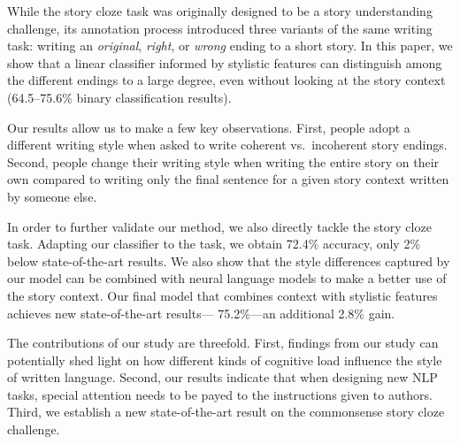 \documentclass[11pt,a4paper]{article}
\newcommand{\com}[1]{}
\newcommand{\resolved}[1]{}
\newcommand{\roy}[1]{{\color{orange}\textsc{[#1 --rs]}}}
\newcommand{\nascomment}[1]{{\color{blue}\textsc{[#1 --nas]}}}
\renewcommand{\roy}[1]{{\color{orange}[#1 --rs]}}
\renewcommand{\roy}[1]{#1}
\renewcommand{\nascomment}[1]{}
\begin{document}

While the story cloze task was originally designed to be a story understanding challenge, 
its annotation process introduced three variants of the same writing task: writing an {\it original}, {\it right}, or {\it wrong} ending to a short story.
In this paper, we show that a linear classifier informed by stylistic features can distinguish among the different endings to a large degree, even without looking at the story context (64.5--75.6\% binary classification results).

Our results allow us to make a few key observations.
First, people adopt a different writing style when asked to write coherent vs.~incoherent story endings.
Second,  people change their writing style when writing the entire story on their own compared to 
writing only the final sentence for a given story context written by someone else.


In order to further validate our method, we also directly tackle the
story cloze task\nascomment{cite the challenge?  a reader may
  not realize that there is a shared task on this}\resolved{\roy{Maybe ``challenge'' was not the right term here. We basically mean the story cloze task. The shared task was the original task w/o any modification, so I am not referring to it specifically here}}. 
 Adapting our classifier to the task, we obtain 72.4\% accuracy, \com{a
 12.5\% increase over the previously reported state-of-the-art  \cite{Salle:2016}}\roy{only 2\% below state-of-the-art results}.
We also show that the style differences captured by our model can be combined with neural language models to make a better use of the story context. 
Our final model that combines context with stylistic features achieves \roy{new state-of-the-art results---}
75.2\%---an additional 2.8\% gain\com{, 15.3\% better than the best
published result}.

\com{Our results suggest that writing style is affected by the the writer's state of mind.
Writing a sentence intended to be {\it wrong} turns out quite differently than a sentence intended to be {\it right}. 
Similarly, writing a sentence as part of the story is different from reading a story, and then writing the final sentence.}

The contributions of our study are threefold. 
First, findings from our study can potentially shed light on 
how different kinds of cognitive load influence the style of written language. 
Second, our results indicate that when designing new NLP tasks, special attention needs to be payed to the instructions given to authors.
Third, we establish a new state-of-the-art result on the commonsense story cloze challenge. 
\end{document}
